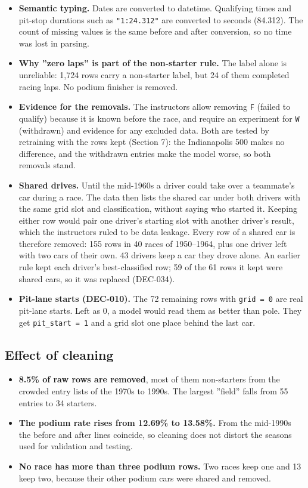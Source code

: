 \documentclass[11pt,a4paper]{article}
\begin{document}
\begin{itemize}
\item \textbf{Semantic typing.} Dates are converted to datetime. Qualifying times and pit-stop durations such as \texttt{"1:24.312"} are converted to seconds (84.312). The count of missing values is the same before and after conversion, so no time was lost in parsing.
\item \textbf{Why ''zero laps'' is part of the non-starter rule.} The label alone is unreliable: 1,724 rows carry a non-starter label, but 24 of them completed racing laps. No podium finisher is removed.
\item \textbf{Evidence for the removals.} The instructors allow removing \texttt{F} (failed to qualify) because it is known before the race, and require an experiment for \texttt{W} (withdrawn) and evidence for any excluded data. Both are tested by retraining with the rows kept (Section 7): the Indianapolis 500 makes no difference, and the withdrawn entries make the model worse, so both removals stand.
\item \textbf{Shared drives.} Until the mid-1960s a driver could take over a teammate's car during a race. The data then lists the shared car under both drivers with the same grid slot and classification, without saying who started it. Keeping either row would pair one driver's starting slot with another driver's result, which the instructors ruled to be data leakage. Every row of a shared car is therefore removed: 155 rows in 40 races of 1950–1964, plus one driver left with two cars of their own. 43 drivers keep a car they drove alone. An earlier rule kept each driver's best-classified row; 59 of the 61 rows it kept were shared cars, so it was replaced (DEC-034).
\item \textbf{Pit-lane starts (DEC-010).} The 72 remaining rows with \texttt{grid = 0} are real pit-lane starts. Left as 0, a model would read them as better than pole. They get \texttt{pit\_\allowbreak{}start = 1} and a grid slot one place behind the last car.
\end{itemize}

\subsection{Effect of cleaning}

\begin{itemize}
\item \textbf{8.5\% of raw rows are removed}, most of them non-starters from the crowded entry lists of the 1970s to 1990s. The largest ''field'' falls from 55 entries to 34 starters.
\item \textbf{The podium rate rises from 12.69\% to 13.58\%.} From the mid-1990s the before and after lines coincide, so cleaning does not distort the seasons used for validation and testing.
\item \textbf{No race has more than three podium rows.} Two races keep one and 13 keep two, because their other podium cars were shared and removed.
\end{itemize}
\end{document}
